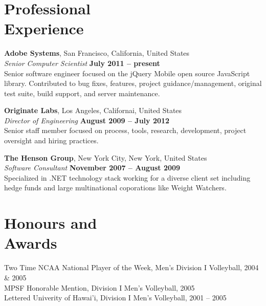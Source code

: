 \documentclass[margin,line]{resume}
\begin{document}
\begin{resume}
    \section{\mysidestyle Professional\\Experience}

    \textbf{Adobe Systems}, San Francisco, California, United States \vspace{2mm}\\\vspace{1mm}%
    \textsl{Senior Computer Scientist} \hfill \textbf{July 2011 -- present}\\
    Senior software engineer focused on the jQuery Mobile open source JavaScript library. Contributed to bug fixes, features, project guidance/management, original test suite, build support, and server maintenance.

    \textbf{Originate Labs}, Los Angeles, Californai, United States \vspace{2mm}\\\vspace{1mm}%
    \textsl{Director of Engineering} \hfill \textbf{August 2009 -- July 2012}\\
    Senior staff member focused on process, tools, research, development, project oversight and hiring practices.

    \textbf{The Henson Group}, New York City, New York, United States \vspace{2mm}\\\vspace{1mm}%
    \textsl{Software Consultant} \hfill \textbf{November 2007 -- August 2009}\\
    Specialized in .NET technology stack working for a diverse client set including hedge funds and large multinational coporations like Weight Watchers.

    \clearpage
    \section{\mysidestyle Honours and\\Awards}

    Two Time NCAA National Player of the Week, Men's Division I Volleyball, 2004 \& 2005
    \vspace{1mm}\\
    MPSF Honorable Mention, Division I Men's Volleyball, 2005
    \vspace{1mm}\\
    Lettered Univerity of Hawai'i, Division I Men's Volleyball, 2001 -- 2005
    \vspace{1mm}\\


\end{resume}
\end{document}
